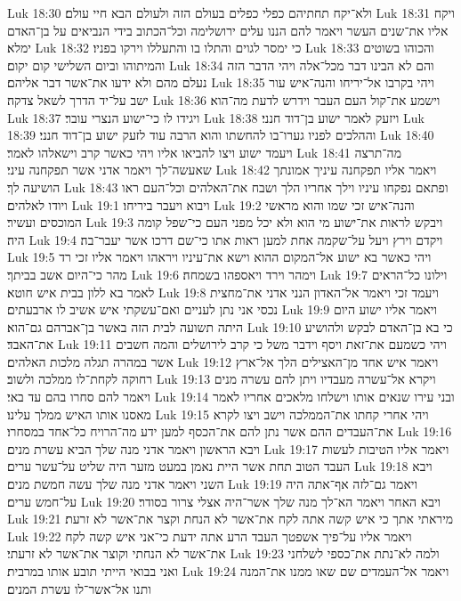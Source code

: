 Luk 18:30  ולא־יקח תחתיהם כפלי כפלים בעולם הזה ולעולם הבא חיי עולם׃
Luk 18:31  ויקח אליו את־שנים העשר ויאמר להם הננו עלים ירושלימה וכל־הכתוב בידי הנביאים על בן־האדם ימלא׃
Luk 18:32  כי ימסר לגוים והתלו בו והתעללו וירקו בפניו׃
Luk 18:33  והכוהו בשוטים והמיתוהו וביום השלישי קום יקום׃
Luk 18:34  והם לא הבינו דבר מכל־אלה ויהי הדבר הזה נעלם מהם ולא ידעו את־אשר דבר אליהם׃
Luk 18:35  ויהי בקרבו אל־יריחו והנה־איש עור ישב על־יד הדרך לשאל צדקה׃
Luk 18:36  וישמע את־קול העם העבר וידרש לדעת מה־הוא׃
Luk 18:37  ויגידו לו כי־ישוע הנצרי עובר׃
Luk 18:38  ויזעק לאמר ישוע בן־דוד חנני׃
Luk 18:39  וההלכים לפניו גערו־בו להחשתו והוא הרבה עוד לזעק ישוע בן־דוד חנני׃
Luk 18:40  ויעמד ישוע ויצו להביאו אליו ויהי כאשר קרב וישאלהו לאמר׃
Luk 18:41  מה־תרצה שאעשה־לך ויאמר אדני אשר תפקחנה עיני׃
Luk 18:42  ויאמר אליו תפקחנה עיניך אמונתך הושיעה לך׃
Luk 18:43  ופתאם נפקחו עיניו וילך אחריו הלך ושבח את־האלהים וכל־העם ראו ויודו לאלהים׃
Luk 19:1  ויבוא ויעבר ביריחו׃
Luk 19:2  והנה־איש זכי שמו והוא מראשי המוכסים ועשיר׃
Luk 19:3  ויבקש לראות את־ישוע מי הוא ולא יכל מפני העם כי־שפל קומה היה׃
Luk 19:4  ויקדם וירץ ויעל על־שקמה אחת למען ראות אתו כי־שם דרכו אשר יעבר־בה׃
Luk 19:5  ויהי כאשר בא ישוע אל־המקום ההוא וישא את־עיניו ויראהו ויאמר אליו זכי רד מהר כי־היום אשב בביתך׃
Luk 19:6  וימהר וירד ויאספהו בשמחה׃
Luk 19:7  וילונו כל־הראים לאמר בא ללון בבית איש חוטא׃
Luk 19:8  ויעמד זכי ויאמר אל־האדון הנני אדני את־מחצית נכסי אני נתן לעניים ואם־עשקתי איש אשיב לו ארבעתים׃
Luk 19:9  ויאמר אליו ישוע היום היתה תשועה לבית הזה באשר בן־אברהם גם־הוא׃
Luk 19:10  כי בא בן־האדם לבקש ולהושיע את־האבד׃
Luk 19:11  ויהי כשמעם את־זאת ויסף וידבר משל כי קרב לירושלים והמה חשבים אשר במהרה תגלה מלכות האלהים׃
Luk 19:12  ויאמר איש אחד מן־האצילים הלך אל־ארץ רחוקה לקחת־לו ממלכה ולשוב׃
Luk 19:13  ויקרא אל־עשרה מעבדיו ויתן להם עשרה מנים ויאמר להם סחרו בהם עד באי׃
Luk 19:14  ובני עירו שנאים אותו וישלחו מלאכים אחריו לאמר מאסנו אותו האיש ממלך עלינו׃
Luk 19:15  ויהי אחרי קחתו את־הממלכה וישב ויצו לקרא את־העבדים ההם אשר נתן להם את־הכסף למען ידע מה־הרויח כל־אחד במסחרו׃
Luk 19:16  ויבא הראשון ויאמר אדני מנה שלך הביא עשרת מנים׃
Luk 19:17  ויאמר אליו הטיבות לעשות העבד הטוב תחת אשר היית נאמן במעט מזער היה שליט על־עשר ערים׃
Luk 19:18  ויבא השני ויאמר אדני מנה שלך עשה חמשת מנים׃
Luk 19:19  ויאמר גם־לזה אף־אתה היה על־חמש ערים׃
Luk 19:20  ויבא האחר ויאמר הא־לך מנה שלך אשר־היה אצלי צרור בסודר׃
Luk 19:21  מיראתי אתך כי איש קשה אתה לקח את־אשר לא הנחת וקצר את־אשר לא זרעת׃
Luk 19:22  ויאמר אליו על־פיך אשפטך העבד הרע אתה ידעת כי־אני איש קשה לקח את־אשר לא הנחתי וקוצר את־אשר לא זרעתי׃
Luk 19:23  ולמה לא־נתת את־כספי לשלחני ואני בבואי הייתי תובע אותו במרבית׃
Luk 19:24  ויאמר אל־העמדים שם שאו ממנו את־המנה ותנו אל־אשר־לו עשרת המנים׃
